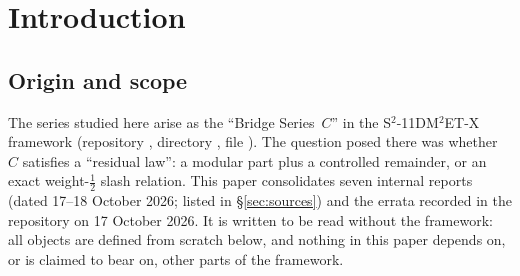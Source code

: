 \documentclass[11pt]{article}
\theoremstyle{definition}
\newcommand{\Cthird}{C_{\mathrm{third}}}
\begin{document}
\begin{abstract}
with the two matched local-parity sectors. It also adds exact dimensions of the function span, its Eisenstein part and its cusp part for
$s=5,\dots,51$ and $s=72$, closed forms in $s$ for the radial coefficients of $H_s$ through $t^{5/2}$, and a single-kernel, two-chain
construction of both parts of $\Cthird$. For the scalar row we prove (given three
earlier inputs) an exact twisted Herglotz/digamma closed form for the cocycle and a closed
Gauss-sum formula for the dual cone sum $E_R$. The cusp rows at rationals are shown numerically to
be finite combinations of Hecke $L$-values at $s=0$. Every statement is labelled Category A (proved, or exact,
including exact finite computation) or Category B (floating-point or PSLQ evidence only, identification by citation only,
interpretation, or conjecture); revision~4 applies this convention uniformly. Revision~5 (\S\ref{sec:rev5}) proves the two-dimensional Euler--Maclaurin input F1, makes the E-part cocycle (with the $140$-label vector law) Category~A, proves the $u_L$ coset property for all $s$ and the squarefree criterion $h=2^{\omega(s)}$, and proves $\dim V=2406$ at $s=98$. No claim is made concerning HQCC termination, the twin prime conjecture, or the Riemann
hypothesis.
\end{abstract}

\tableofcontents

\section{Introduction}

\subsection{Origin and scope}
The series studied here arise as the ``Bridge Series~$C$'' in the S$^2$-11DM$^2$ET-X framework
(repository , directory
, file ).
The question posed there was whether $C$ satisfies a ``residual law'': a modular part plus a controlled
remainder, or an exact weight-$\tfrac12$ slash relation. This paper consolidates seven internal reports
(dated 17--18 October 2026; listed in \S\ref{sec:sources}) and the errata recorded in the repository on
17 October 2026. It is written to be read without the framework: all objects are defined from scratch
below, and nothing in this paper depends on, or is claimed to bear on, other parts of the framework.
\end{document}
